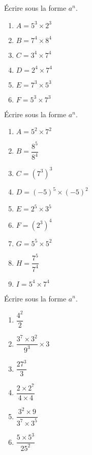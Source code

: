 \documentclass[11pt]{article}
\begin{document}
\begin{multicols}{2}
\begin{exercice}[1]
Écrire sous la forme $a^n$.
\begin{multicols}{2}
\begin{enumerate}[label=\arabic*)]
\item $A=5^{3}\times 2^{3}$
\item $B=7^{4}\times 8^{4}$
\item $C=3^{4}\times 7^{4}$
\item $D=2^{4}\times 7^{4}$
\item $E=7^{3}\times 5^{3}$
\item $F=5^{3}\times 7^{3}$
\end{enumerate}
\end{multicols}
\end{exercice}
\end{multicols}

\begin{exercice}[2]
Écrire sous la forme $a^n$.
\begin{multicols}{3}
\begin{enumerate}[label=\arabic*)]
\item $A=5^{2}\times 7^{2}$
\item $B=\dfrac{8^{5}}{8^{4}}$
\item $C=(7^{3})^{3}$
\item $D=(-5)^{5}\times (-5)^{2}$
\item $E=2^{5}\times 3^{5}$
\item $F=(2^{3})^{4}$
\item $G=5^{5}\times 5^{2}$
\item $H=\dfrac{7^{5}}{7^{4}}$
\item $I=5^{4}\times 7^{4}$
\end{enumerate}
\end{multicols}
\end{exercice}

\begin{exercice}[3]
Écrire sous la forme $a^n$.
\begin{multicols}{3}
\begin{enumerate}[label=\arabic*)]
	\item  $\dfrac{4^2}{2}$ 
	\item  $\dfrac{3^7\times 3^2}{9^3}\times 3$ 
	\item  $\dfrac{27^3}{3}$ 
	\item  $\dfrac{2\times 2^7}{4\times 4}$ 
	\item  $\dfrac{3^2\times 9}{3^7 \times 3^5}$ 
	\item  $\dfrac{5\times 5^3}{25^2}$ 
\end{enumerate}
\end{multicols}
\end{exercice}

\end{document}
